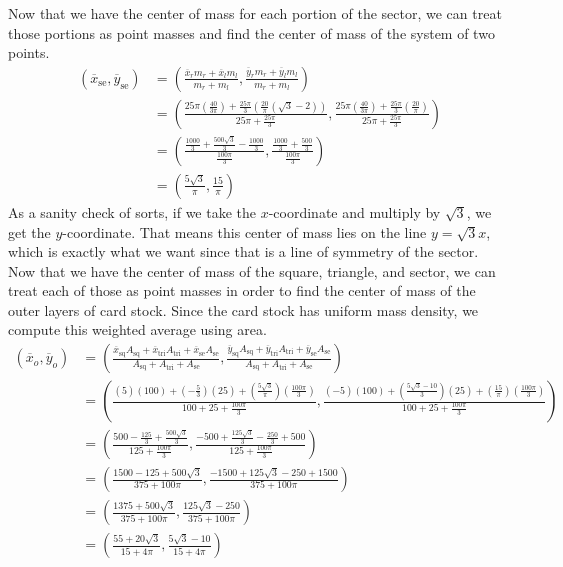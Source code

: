 \documentclass[12pt]{amsart}
\begin{document}
Now that we have the center of mass for each portion of the sector, we can treat those portions as point masses and find the center of mass of the system of two points.
\begin{align*} \left( \overline{x}_{\text{se}}, \overline{y}_{\text{se}}\right) & = \left(\frac{\overline{x}_rm_r + \overline{x}_lm_l}{m_r + m_l}, \frac{\overline{y}_rm_r + \overline{y}_lm_l}{m_r + m_l} \right)\\ 
& = \left(\frac{25\pi\left( \frac{40}{3\pi}\right) + \frac{25\pi}{3}\left(\frac{20}{\pi}\left(\sqrt{3} - 2\right)\right)}{25\pi + \frac{25\pi}{3}}, \frac{25\pi\left(\frac{40}{3\pi}\right) + \frac{25\pi}{3}\left(\frac{20}{\pi}\right)}{25\pi + \frac{25\pi}{3}} \right)\\
& = \left(\frac{\frac{1000}{3} + \frac{500\sqrt{3}}{3} - \frac{1000}{3}}{\frac{100\pi}{3}}, \frac{\frac{1000}{3} + \frac{500}{3}}{\frac{100\pi}{3}} \right)\\
& = \left(\frac{5\sqrt{3}}{\pi}, \frac{15}{\pi} \right)
\end{align*}
As a sanity check of sorts, if we take the $x$-coordinate and multiply by $\sqrt{3}$, we get the $y$-coordinate. That means this center of mass lies on the line $y = \sqrt{3}x$, which is exactly what we want since that is a line of symmetry of the sector.\\

Now that we have the center of mass of the square, triangle, and sector, we can treat each of those as point masses in order to find the center of mass of the outer layers of card stock. Since the card stock has uniform mass density, we compute this weighted average using area.
\begin{align*}\left(\overline{x}_o, \overline{y}_o\right) & = \left(\frac{\overline{x}_{\text{sq}}A_{\text{sq}} + \overline{x}_{\text{tri}}A_{\text{tri}} + \overline{x}_{\text{se}}A_{\text{se}}}{A_{\text{sq}} + A_{\text{tri}} + A_{\text{se}}} , \frac{\overline{y}_{\text{sq}}A_{\text{sq}} + \overline{y}_{\text{tri}}A_{\text{tri}} + \overline{y}_{\text{se}}A_{\text{se}}}{A_{\text{sq}} + A_{\text{tri}} + A_{\text{se}}}\right)\\
& = \left(\frac{(5)(100) + \left(-\frac{5}{3}\right)(25) + \left(\frac{5\sqrt{3}}{\pi}\right)\left(\frac{100\pi}{3}\right)}{100 + 25 + \frac{100\pi}{3}}, \frac{(-5)(100) + \left(\frac{5\sqrt{3} - 10}{3}\right)\left(25\right)+ \left(\frac{15}{\pi}\right)\left(\frac{100\pi}{3}\right)}{100 + 25 + \frac{100\pi}{3}} \right)\\
& = \left(\frac{500 - \frac{125}{3} + \frac{500\sqrt{3}}{3}}{125 + \frac{100\pi}{3}}, \frac{-500 + \frac{125\sqrt{3}}{3} - \frac{250}{3} + 500}{125 + \frac{100\pi}{3}} \right)\\
& = \left(\frac{1500 - 125 + 500\sqrt{3}}{375 + 100\pi}, \frac{-1500 + 125\sqrt{3} - 250 + 1500}{375 + 100\pi}\right)\\
& = \left(\frac{1375 + 500\sqrt{3}}{375 + 100\pi},\frac{125\sqrt{3} - 250}{375 + 100\pi} \right)\\
& = \left(\frac{55 + 20\sqrt{3}}{15 + 4\pi},\frac{5\sqrt{3} - 10}{15 + 4\pi} \right)
\end{align*}
\end{document}

